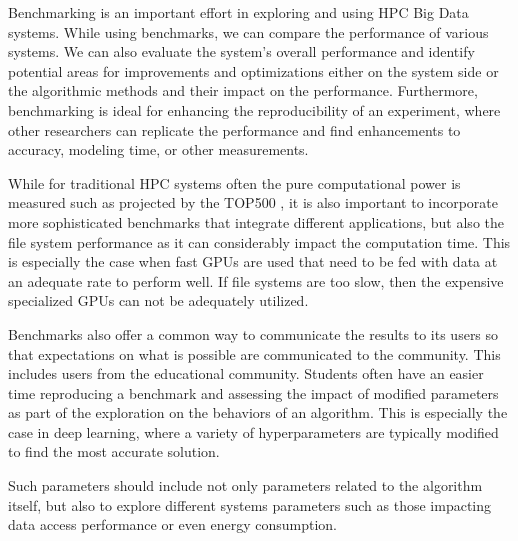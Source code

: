 \documentclass[utf8]{FrontiersinVancouver} %
\begin{document}
Benchmarking is an important effort in exploring and using HPC Big Data systems.  While using benchmarks, we can compare the performance of various systems. We can also evaluate the system's overall performance and identify potential areas for improvements and optimizations either on the system side or the algorithmic methods and their impact on the performance. Furthermore, benchmarking is ideal for enhancing the reproducibility of an experiment, where other researchers can replicate the performance and find enhancements to accuracy, modeling time, or other measurements.

While for traditional HPC systems often the pure computational power is measured such as projected by the TOP500 \cite{dongarra1997top500,www-top500}, it is also important to incorporate more sophisticated benchmarks that integrate different applications, but also the file system performance as it can considerably impact the computation time. This is especially the case when fast GPUs are used that need to be fed with data at an adequate rate to perform well. If file systems are too slow, then the expensive specialized GPUs can not be adequately utilized.

Benchmarks also offer a common way to communicate the results to its users so that expectations on what is possible are communicated to the community. This includes users from the educational community. Students often have an easier time reproducing a benchmark and assessing the impact of modified parameters as part of the exploration on the behaviors of an algorithm. This is especially the case in deep learning, where a variety of hyperparameters are typically modified to find the most accurate solution.

Such parameters should include not only parameters related to the algorithm itself, but also to explore different systems parameters such as those impacting data access performance or even energy consumption.
\end{document}
